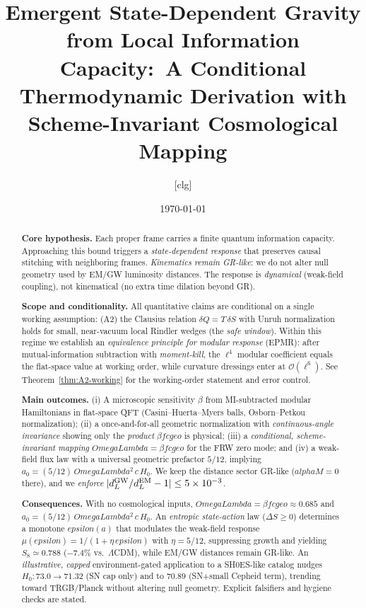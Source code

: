 \documentclass[aps,prd,onecolumn,superscriptaddress,nofootinbib]{revtex4-2}
\def\OmL{OmegaLambda}%
\def\cgeo{cgeo}%
\def\alphaM{alphaM}%
\def\eps{epsilon}%
\newcommand{\OmL}{\Omega_\Lambda}
\newcommand{\cgeo}{c_{\rm geo}}
\newcommand{\alphaM}{\alpha_M}
\newcommand{\eps}{\varepsilon}
\begin{document}
\title{Emergent State-Dependent Gravity from Local Information Capacity:\
A Conditional Thermodynamic Derivation with Scheme-Invariant Cosmological Mapping}

\author{[clg]}
\date{\today}

\begin{abstract}
\textbf{Core hypothesis.} Each proper frame carries a finite quantum information capacity. Approaching this bound triggers a \emph{state-dependent response} that preserves causal stitching with neighboring frames. \emph{Kinematics remain GR-like}: we do not alter null geometry used by EM/GW luminosity distances. The response is \emph{dynamical} (weak-field coupling), not kinematical (no extra time dilation beyond GR).

\textbf{Scope and conditionality.} All quantitative claims are conditional on a single working assumption: (A2) the Clausius relation $\delta Q = T\,\delta S$ with Unruh normalization holds for small, near-vacuum local Rindler wedges (the \emph{safe window}). Within this regime we establish an \emph{equivalence principle for modular response} (EPMR): after mutual-information subtraction with \emph{moment-kill}, the $\ell^4$ modular coefficient equals the flat-space value at working order, while curvature dressings enter at $\mathcal O(\ell^6)$. See Theorem~\ref{thm:A2-working} for the working-order statement and error control.

\textbf{Main outcomes.} (i) A microscopic sensitivity $\beta$ from MI-subtracted modular Hamiltonians in flat-space QFT (Casini--Huerta--Myers balls, Osborn--Petkou normalization); (ii) a once-and-for-all geometric normalization with \emph{continuous-angle invariance} showing only the \emph{product} $\beta f \cgeo$ is physical; (iii) a \emph{conditional, scheme-invariant mapping} $\OmL=\beta f \cgeo$ for the FRW zero mode; and (iv) a weak-field flux law with a universal geometric prefactor $5/12$, implying $a_0=(5/12)\,\OmL^2\,c\,H_0$. We keep the distance sector GR-like ($\alphaM=0$ there), and we \emph{enforce} $|d_L^{\rm GW}/d_L^{\rm EM}-1|\le 5\times 10^{-3}$.

\textbf{Consequences.} With no cosmological inputs, $\OmL=\beta f \cgeo \approx 0.685$ and $a_0=(5/12)\,\OmL^2\,c\,H_0$. An \emph{entropic state-action} law ($\Delta S\ge 0$) determines a monotone $\eps(a)$ that modulates the weak-field response $\mu(\eps)=1/(1+\eta\,\eps)$ with $\eta=5/12$, suppressing growth and yielding $S_8\simeq 0.788$ ($-7.4\%$ vs.\ $\Lambda$CDM), while EM/GW distances remain GR-like. An \emph{illustrative, capped} environment-gated application to a SH0ES-like catalog nudges $H_0: 73.0\to 71.32$ (SN cap only) and to $70.89$ (SN+small Cepheid term), trending toward TRGB/Planck without altering null geometry. Explicit falsifiers and hygiene checks are stated.
\end{abstract}
\end{document}
